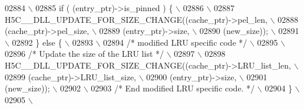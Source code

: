 \begin{DoxyCode}
02884 \textcolor{preprocessor}{                                      \(\backslash\)}
02885 \textcolor{preprocessor}{    if ( (entry\_ptr)->is\_pinned ) \{                                       \(\backslash\)}
02886 \textcolor{preprocessor}{                                                                          \(\backslash\)}
02887 \textcolor{preprocessor}{    H5C\_\_DLL\_UPDATE\_FOR\_SIZE\_CHANGE((cache\_ptr)->pel\_len,             \(\backslash\)}
02888 \textcolor{preprocessor}{                            (cache\_ptr)->pel\_size,            \(\backslash\)}
02889 \textcolor{preprocessor}{                            (entry\_ptr)->size,                \(\backslash\)}
02890 \textcolor{preprocessor}{                    (new\_size));                      \(\backslash\)}
02891 \textcolor{preprocessor}{                                                                          \(\backslash\)}
02892 \textcolor{preprocessor}{    \} else \{                                                              \(\backslash\)}
02893 \textcolor{preprocessor}{                                                                          \(\backslash\)}
02894 \textcolor{preprocessor}{        }\textcolor{comment}{/* modified LRU specific code */}\textcolor{preprocessor}{                                  \(\backslash\)}
02895 \textcolor{preprocessor}{                                                                          \(\backslash\)}
02896 \textcolor{preprocessor}{    }\textcolor{comment}{/* Update the size of the LRU list */}\textcolor{preprocessor}{                             \(\backslash\)}
02897 \textcolor{preprocessor}{                                                                          \(\backslash\)}
02898 \textcolor{preprocessor}{    H5C\_\_DLL\_UPDATE\_FOR\_SIZE\_CHANGE((cache\_ptr)->LRU\_list\_len,        \(\backslash\)}
02899 \textcolor{preprocessor}{                            (cache\_ptr)->LRU\_list\_size,       \(\backslash\)}
02900 \textcolor{preprocessor}{                            (entry\_ptr)->size,                \(\backslash\)}
02901 \textcolor{preprocessor}{                    (new\_size));                      \(\backslash\)}
02902 \textcolor{preprocessor}{                                                                          \(\backslash\)}
02903 \textcolor{preprocessor}{        }\textcolor{comment}{/* End modified LRU specific code. */}\textcolor{preprocessor}{                             \(\backslash\)}
02904 \textcolor{preprocessor}{    \}                                                                     \(\backslash\)}
02905 \textcolor{preprocessor}{                                                                          \(\backslash\)}

\end{DoxyCode}
